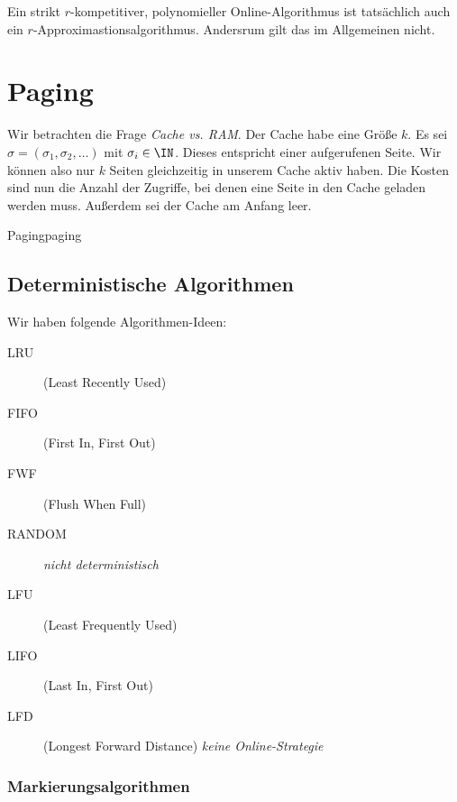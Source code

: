 \documentclass[language=ngerman,algolist]{TemplateLecture}
\begin{document}
Ein strikt $r$-kompetitiver, polynomieller Online-Algorithmus ist tatsächlich auch ein $r$-Approxi\-mastionsalgorithmus. Andersrum gilt das im Allgemeinen nicht.

\chapter{Paging}

Wir betrachten die Frage \emph{Cache vs. RAM}. Der Cache habe eine Größe $k$. Es sei $\sigma = (\sigma_1, \sigma_2, \ldots)$ mit $\sigma_i \in \IN$. Dieses entspricht einer aufgerufenen Seite. Wir können also nur $k$ Seiten gleichzeitig in unserem Cache aktiv haben. Die Kosten sind nun die Anzahl der Zugriffe, bei denen eine Seite in den Cache geladen werden muss. Außerdem sei der Cache am Anfang leer.

\begin{prob}{Paging}{paging}
\end{prob}

\section{Deterministische Algorithmen}
Wir haben folgende Algorithmen-Ideen:
\begin{description}
    \item[LRU] (Least Recently Used)
    \item[FIFO] (First In, First Out)
    \item[FWF] (Flush When Full)
    \item[RANDOM] \emph{nicht deterministisch}
    \item[LFU] (Least Frequently Used)
    \item[LIFO] (Last In, First Out)
    \item[LFD] (Longest Forward Distance) \emph{keine Online-Strategie}
\end{description}

\subsection{Markierungsalgorithmen}
\end{document}
